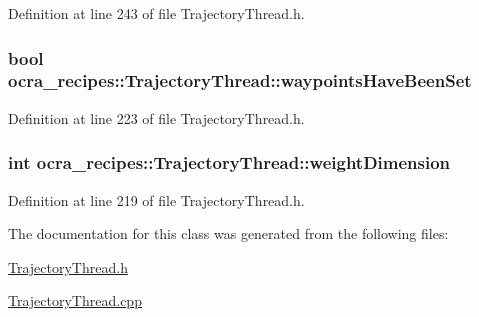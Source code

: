 Definition at line 243 of file Trajectory\+Thread.\+h.

\subsubsection[{\texorpdfstring{waypoints\+Have\+Been\+Set}{waypointsHaveBeenSet}}]{\setlength{\rightskip}{0pt plus 5cm}bool ocra\+\_\+recipes\+::\+Trajectory\+Thread\+::waypoints\+Have\+Been\+Set\hspace{0.3cm}{\ttfamily [protected]}}\hypertarget{classocra__recipes_1_1TrajectoryThread_a35b51009ac64e577770b0e728846c4c4}{}\label{classocra__recipes_1_1TrajectoryThread_a35b51009ac64e577770b0e728846c4c4}


Definition at line 223 of file Trajectory\+Thread.\+h.

\subsubsection[{\texorpdfstring{weight\+Dimension}{weightDimension}}]{\setlength{\rightskip}{0pt plus 5cm}int ocra\+\_\+recipes\+::\+Trajectory\+Thread\+::weight\+Dimension\hspace{0.3cm}{\ttfamily [protected]}}\hypertarget{classocra__recipes_1_1TrajectoryThread_a32ee7b3f9364768200a460283f7be5ef}{}\label{classocra__recipes_1_1TrajectoryThread_a32ee7b3f9364768200a460283f7be5ef}


Definition at line 219 of file Trajectory\+Thread.\+h.



The documentation for this class was generated from the following files\+:\begin{DoxyCompactItemize}
\item 
\hyperlink{TrajectoryThread_8h}{Trajectory\+Thread.\+h}\item 
\hyperlink{TrajectoryThread_8cpp}{Trajectory\+Thread.\+cpp}\end{DoxyCompactItemize}
